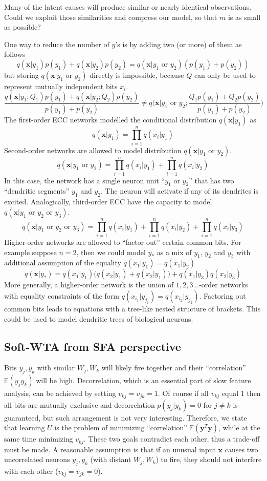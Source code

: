 \documentclass[oneside,english,logo]{amuthesis}
\begin{document}
Many of the latent causes will produce similar or nearly identical observations. Could we exploit those similarities and compress our model, so that $m$ is as small as possible? 

One way to reduce the number of $y$'s is by adding two (or more) of them as follows
\[
q(\boldsymbol{x}|y_1) p(y_1)+q(\boldsymbol{x}|y_2) p(y_2) = 
q(\boldsymbol{x}|y_1\text{ or }y_2) (p(y_1)+p(y_2))
\]
but storing $q(\boldsymbol{x}|y_1\text{ or }y_2)$ directly is impossible, because $Q$ can only be used to represent mutually independent bits $x_i$. 
\[
\frac{q(\boldsymbol{x}|y_1;Q_1) p(y_1)+q(\boldsymbol{x}|y_2;Q_2) p(y_2)}{p(y_1)+p(y_2)} \ne 
q\big(\boldsymbol{x}|y_1\text{ or }y_2;\frac{Q_1p(y_1) +Q_2p(y_2)}{p(y_1)+p(y_2)}\big) 
\]
The first-order ECC networks modelled the conditional distribution $q(\boldsymbol{x}|y_1)$ as
\[
q(\boldsymbol{x}|y_1) = \prod_{i=1}^{n}q(x_i|y_1)
\]
Second-order networks are allowed to model distribution $q(\boldsymbol{x}|y_1\text{ or }y_2)$. 
\[
q(\boldsymbol{x}|y_1\text{ or }y_2) = \prod_{i=1}^{n}q(x_i|y_1) + \prod_{i=1}^{n}q(x_i|y_2)
\]
In this case, the network has a single neuron unit ``$y_1\text{ or }y_2$'' that has two ``dendritic segments'' $y_1$ and $y_2$. The neuron will activate if any of its dendrites is excited. Analogically, third-order ECC have the capacity to model $q(\boldsymbol{x}|y_1\text{ or }y_2\text{ or }y_3)$. 
\[
q(\boldsymbol{x}|y_1\text{ or }y_2\text{ or }y_3) = \prod_{i=1}^{n}q(x_i|y_1) + \prod_{i=1}^{n}q(x_i|y_2) + \prod_{i=1}^{n}q(x_i|y_3)
\]
Higher-order networks are allowed to ``factor out'' certain common bits. For example suppose $n=2$, then we could model $y_*$ as a mix of $y_1$, $y_2$ and $y_3$ with additional assumption of the equality $q(x_1|y_1)=q(x_1|y_2)$
\[
q(\boldsymbol{x}|y_*) = q(x_1|y_1)\big(q(x_2|y_1) +q(x_2|y_1)\big) + q(x_1|y_3)q(x_2|y_3)
\]
More generally, a higher-order network is the union of $1,2,3...$-order networks with equality constraints of the form $q(x_{i_1}|y_{j_1})=q(x_{i_2}|y_{j_2})$. Factoring out common bits leads to equations with a tree-like nested structure of brackets. This could be used to model dendritic trees of biological neurons. 


\subsection{Soft-WTA from SFA perspective}
Bits $y_j,y_k$ with similar $W_j,W_k$ will likely fire together and their ``correlation'' $\mathbb{E}(y_j y_k)$ will be high. Decorrelation, which is an essential part of slow feature analysis, can be achieved by setting $v_{kj}=v_{jk}=1$. Of course if all $v_{kj}$ equal $1$ then all bits are mutually exclusive and decorrelation $p(y_j|y_k) = 0$ for $j\ne k$ is guaranteed, but such arrangement is not very interesting. Therefore, we state that learning $U$ is the problem of minimizing ``correlation'' $\mathbb{E}(\boldsymbol{y}^T \boldsymbol{y})$, while at the same time minimizing $v_{kj}$. These two goals contradict each other, thus a trade-off  must be made. A reasonable assumption is that if an unusual input $\boldsymbol{x}$ causes two uncorrelated neurons $y_j,y_k$ (with distant $W_j,W_k$) to fire, they should not interfere with each other ($v_{kj}=v_{jk}=0$). 
\end{document}
